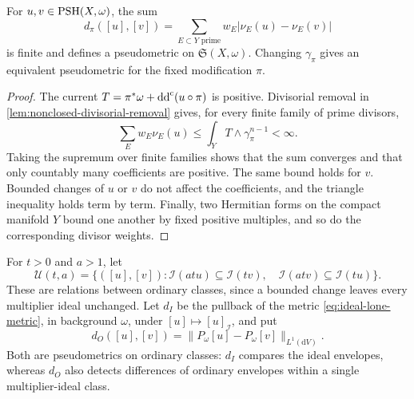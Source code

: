 \begin{lemma}\label{lem:fixed-model-divisorial-variation}
For $u,v\in\mathrm{PSH}(X,\omega)$, the sum
\begin{equation}\label{eq:fixed-model-divisorial-variation}
 d_\pi([u],[v])=\sum_{E\subset Y\text{ prime}}w_E|\nu_E(u)-\nu_E(v)|
\end{equation}
is finite and defines a pseudometric on $\mathfrak S(X,\omega)$. Changing $\gamma_\pi$ gives an equivalent pseudometric for the fixed modification $\pi$.
\end{lemma}
\begin{proof}
The current $T=\pi^*\omega+\mathrm{dd}^{\mathrm{c}}(u\circ\pi)$ is positive. Divisorial removal in \cref{lem:nonclosed-divisorial-removal} gives, for every finite family of prime divisors,
\[
 \sum_Ew_E\nu_E(u)\leq\int_YT\wedge\gamma_\pi^{n-1}<\infty.
\]
Taking the supremum over finite families shows that the sum converges and that only countably many coefficients are positive. The same bound holds for $v$. Bounded changes of $u$ or $v$ do not affect the coefficients, and the triangle inequality holds term by term. Finally, two Hermitian forms on the compact manifold $Y$ bound one another by fixed positive multiples, and so do the corresponding divisor weights.
\end{proof}

For $t>0$ and $a>1$, let
\begin{equation}\label{eq:controlled-ideal-entourage}
 \mathcal U(t,a)=\{([u],[v]):\mathcal I(atu)\subseteq\mathcal I(tv),\quad
                         \mathcal I(atv)\subseteq\mathcal I(tu)\}.
\end{equation}
These are relations between ordinary classes, since a bounded change leaves every multiplier ideal unchanged. Let $d_I$ be the pullback of the metric \eqref{eq:ideal-lone-metric}, in background $\omega$, under $[u]\mapsto[u]_{\mathcal I}$, and put
\[
 d_O([u],[v])=\|P_\omega[u]-P_\omega[v]\|_{L^1(\mathrm dV)}.
\]
Both are pseudometrics on ordinary classes: $d_I$ compares the ideal envelopes, whereas $d_O$ also detects differences of ordinary envelopes within a single multiplier-ideal class.

